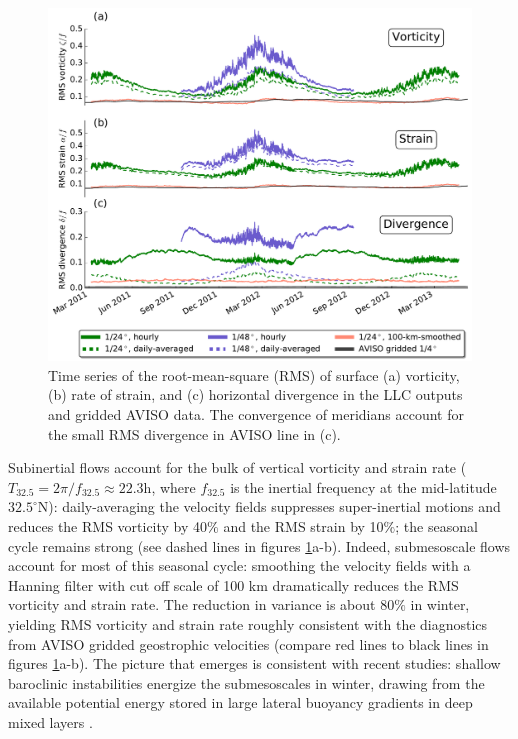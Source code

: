 \documentclass[grl]{agutex2015}
\begin{document}
\begin{article}
 \begin{figure}[ht]
   \begin{center}
     \includegraphics[width=.65\textwidth]{figs/fig2.pdf}
  \caption{\small Time series of the root-mean-square (RMS) of surface (a) vorticity,
  (b) rate of strain, and (c) horizontal divergence in the LLC outputs and gridded AVISO data.
  The convergence of meridians account for the small RMS divergence in AVISO line in (c).}
  \label{fig2}
  \end{center}
\end{figure}

Subinertial flows account for the bulk of vertical vorticity and strain rate
($T_{32.5} = 2\pi/f_{32.5}\approx 22.3$h, where $f_{32.5}$ is the inertial frequency at
the  mid-latitude $32.5^\circ$N): daily-averaging the velocity fields suppresses super-inertial
motions and reduces the RMS
vorticity by 40$\%$ and the RMS strain by 10$\%$; the seasonal
cycle remains strong (see
dashed lines in figures \ref{fig2}a-b). Indeed, submesoscale flows account for
most of this seasonal cycle: smoothing the velocity fields
with a Hanning filter with cut off scale of 100 km dramatically reduces the RMS
vorticity and strain rate. The reduction in variance is about 80$\%$ in winter,
yielding RMS vorticity and strain  rate roughly consistent with the diagnostics from
AVISO gridded geostrophic velocities (compare red lines to black lines in figures \ref{fig2}a-b).
The picture that emerges is consistent with recent studies: shallow baroclinic
instabilities energize the submesoscales in winter, drawing from the available
potential energy stored in large lateral buoyancy gradients in deep mixed layers \citep{sasaki_etal2014,callies_etal2015,callies_etal2016}.


\end{article}
\end{document}
